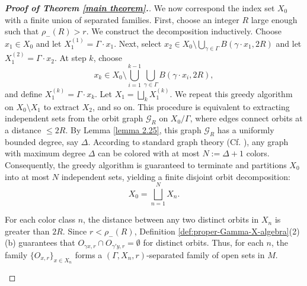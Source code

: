 \documentclass[pdflatex]{sn-jnl}
\theoremstyle{plain}
\theoremstyle{definition}
\begin{document}
\begin{proof}[\textbf{Proof of Theorem \ref{main theorem}.}]
We now correspond the index set $X_{0}$ with a finite union of separated families. First, choose an integer $R$ large enough such that $\rho _{-}(R)>r$. We construct the decomposition inductively. Choose $x_1 \in X_{0}$ and let $X_1^{(1)}=\Gamma\cdot x_1$. Next, select $x_2\in X_0\setminus\bigcup_{\gamma\in\Gamma} B(\gamma\cdot x_1, 2R)$ and let $X_{1}^{(2)}=\Gamma\cdot x_{2}$. At step $k$, choose
\[x_k\in X_0\setminus\bigcup_{i=1}^{k-1}\bigcup_{\gamma \in\Gamma}B(\gamma\cdot x_i,2R),\]
and define $X_1^{(k)}=\Gamma\cdot x_k$. Let $X_1=\bigsqcup_{k}X_1^{(k)}$. We repeat this greedy algorithm \cite{BM08} on $X_{0}\setminus X_1$ to extract $X_2$, and so on. 
This procedure is equivalent to extracting independent sets from the orbit graph $\mathcal{G}_R$ on $X_0/\Gamma$, where edges connect orbits at a distance $\leq 2R$. By Lemma \ref{lemma 2.25}, this graph $\mathcal{G}_R$ has a uniformly bounded degree, say $\Delta$. According to standard graph theory (Cf. \cite{Die17}), any graph with maximum degree $\Delta$ can be colored with at most $N:=\Delta+1$ colors. Consequently, the greedy algorithm is guaranteed to terminate and partitions $X_{0}$ into at most $N$ independent sets, yielding a finite disjoint orbit decomposition:
\[X_{0}=\bigsqcup_{n=1}^{N}X_n.\]

For each color class $n$, the distance between any two distinct orbits in $X_n$ is greater than $2R$. Since $r<\rho_{-}(R)$, Definition \ref{def:proper-Gamma-X-algebra}(2)(b) guarantees that $O_{\gamma x, r}\cap O_{\gamma' y,r}=\emptyset$ for distinct orbits. Thus, for each $n$, the family $\{O_{x,r}\}_{x\in X_n}$ forms a $(\Gamma, X_n,r)$-separated family of open sets in $M$.

\begin{figure}[htbp]
\centering
{}
\end{figure}
\end{proof}
\end{document}
